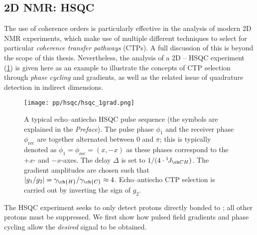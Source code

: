 \subsection{2D NMR: HSQC}
\label{subsec:theory__hsqc}

The use of coherence orders is particularly effective in the analysis of modern 2D NMR experiments, which make use of multiple different techniques to select for particular \textit{coherence transfer pathways} (CTPs).
A full discussion of this is beyond the scope of this thesis.
Nevertheless, the analysis of a 2D \proton{}--\carbon{} HSQC experiment (\cref{fig:hsqc_1grad}) is given here as an example to illustrate the concepts of CTP selection through \textit{phase cycling} and gradients, as well as the related issue of quadrature detection in indirect dimensions.

\begin{figure}[ht]
    \centering
    \texttt{[image: pp/hsqc/hsqc\_1grad.png]}
    \caption[Echo--antiecho HSQC pulse sequence]{
        A typical echo--antiecho HSQC pulse sequence (the symbols are explained in the \textit{Preface}).
        The pulse phase $\phi_1$ and the receiver phase $\phi_\text{rec}$ are together alternated between $0$ and $\pi$; this is typically denoted as $\phi_1 = \phi_\text{rec} = (x, -x)$ as these phases correspond to the $+x$- and $-x$-axes.
        The delay $\Delta$ is set to $1/(4 \cdot \oneJ{CH})$.
        The gradient amplitudes are chosen such that $|g_1/g_2| = \gamma_{\ch{H}}/\gamma_{\ch{C}} \approx 4$.
        Echo--antiecho CTP selection is carried out by inverting the sign of $g_2$.
    }
    \label{fig:hsqc_1grad}
\end{figure}

The HSQC experiment seeks to only detect protons directly bonded to \carbon{}; all other protons must be suppressed.
We first show how pulsed field gradients and phase cycling allow the \textit{desired} signal to be obtained.



